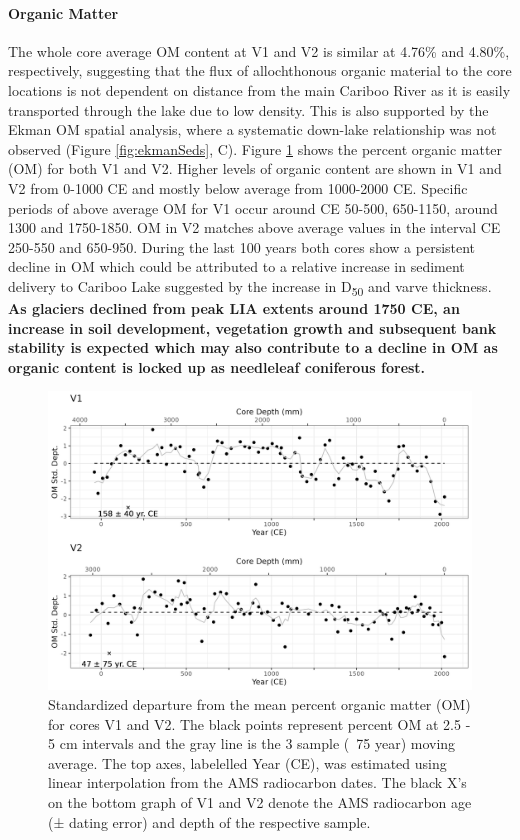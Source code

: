 \documentclass[Royal,times,doublespace,sageh]{sagej}
\begin{document}
\hypertarget{organic-matter}{%
\paragraph{Organic Matter}\label{organic-matter}}

The whole core average OM content at V1 and V2 is similar at 4.76\% and
4.80\%, respectively, suggesting that the flux of allochthonous organic
material to the core locations is not dependent on distance from the
main Cariboo River as it is easily transported through the lake due to
low density. This is also supported by the Ekman OM spatial analysis,
where a systematic down-lake relationship was not observed (Figure
\ref{fig:ekmanSeds}, C). Figure \ref{fig:loi} shows the percent organic
matter (OM) for both V1 and V2. Higher levels of organic content are
shown in V1 and V2 from 0-1000 CE and mostly below average from
1000-2000 CE. Specific periods of above average OM for V1 occur around
CE 50-500, 650-1150, around 1300 and 1750-1850. OM in V2 matches above
average values in the interval CE 250-550 and 650-950. During the last
100 years both cores show a persistent decline in OM which could be
attributed to a relative increase in sediment delivery to Cariboo Lake
suggested by the increase in D\textsubscript{50} and varve thickness.
\textbf{As glaciers declined from peak LIA extents around 1750 CE, an
increase in soil development, vegetation growth and subsequent bank
stability is expected which may also contribute to a decline in OM as
organic content is locked up as needleleaf coniferous forest.}

\begin{figure}

{\centering \includegraphics[width=1\linewidth]{figs/V1_V2_LOI_vs_depth_and_C14_est_yr} 

}

\caption{Standardized departure from the mean percent organic matter (OM) for cores V1 and V2. The black points represent percent OM at 2.5 - 5 cm intervals and the gray line is the 3 sample (~75 year) moving average. The top axes, labelelled Year (CE), was estimated using linear interpolation from the AMS radiocarbon dates. The black X's on the bottom graph of V1 and V2 denote the AMS radiocarbon age (± dating error) and depth of the respective sample.\label{loi}}\label{fig:loi}
\end{figure}
\end{document}
